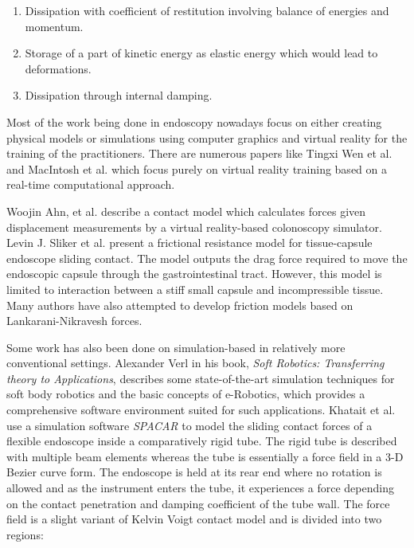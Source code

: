 \documentclass[12pt]{report}
\begin{document}
\begin{enumerate}
	\item Dissipation with coefficient of restitution involving balance of energies and momentum.\par

	\item Storage of a part of kinetic energy as elastic energy which would lead to deformations. \par

	\item Dissipation through internal damping.
\end{enumerate}\par

Most of the work being done in endoscopy nowadays focus on either creating physical models or simulations using computer graphics and virtual reality for the training of the practitioners. There are numerous papers like Tingxi Wen et al.\cite{Wen2018} and MacIntosh et al.\cite{mcintoshComputerbasedVirtualReality2014} which focus purely on virtual reality training based on a real-time computational approach.\par

Woojin Ahn, et al.\cite{1571560} describe a contact model which calculates forces given displacement measurements by a virtual reality-based colonoscopy simulator. Levin J. Sliker et al.\cite{SLIKER2016472} present a frictional resistance model for tissue-capsule endoscope sliding contact. The model outputs the drag force required to move the endoscopic capsule through the gastrointestinal tract. However, this model is limited to interaction between a stiff small capsule and incompressible tissue.  Many authors have also attempted to develop friction models based on Lankarani-Nikravesh forces.\par

Some work has also been done on simulation-based in relatively more conventional settings. Alexander Verl in his book, \textit{Soft Robotics: Transferring theory to Applications}, describes some state-of-the-art simulation techniques for soft body robotics and the basic concepts of e-Robotics, which provides a comprehensive software environment suited for such applications. Khatait et al.\cite{inproceedings} use a simulation software \textit{SPACAR }to model the sliding contact forces of a flexible endoscope inside a comparatively rigid tube. The rigid tube is described with multiple beam elements whereas the tube is essentially a force field in a 3-D Bezier curve form. The endoscope is held at its rear end where no rotation is allowed and as the instrument enters the tube, it experiences a force depending on the contact penetration and damping coefficient of the tube wall. The force field is a slight variant of Kelvin Voigt contact model and is divided into two regions: \par
\end{document}
